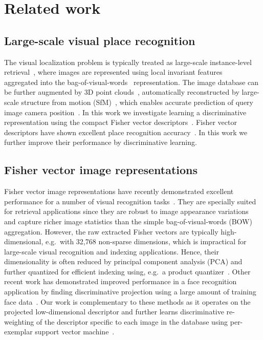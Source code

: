 \documentclass[table]{article} %
\begin{document}
\section{Related work} 
\label{sec:related}

\subsection*{Large-scale visual place recognition} \vspace{-3mm}
    The visual localization problem is typically treated as large-scale instance-level retrieval~\cite{Cummins09,Chen11,Gronat13,Knopp2010,Schindler07,Torii2013,Zamir10}, where images are represented using local invariant
    features~\cite{Lowe04} aggregated into the bag-of-visual-words~\cite{Csurka04,Sivic03} representation. 
    The image database can be further augmented by 3D point clouds~\cite{Klinger13}, automatically
    reconstructed by large-scale structure from motion
    (SfM)~\cite{Agarwal-ICCV-2009,Klinger13}, which enables
    accurate prediction of query image camera
    position~\cite{Li12,Sattler12}.
    In this work we investigate learning a discriminative representation using the compact Fisher vector descriptors~\cite{Jegou12}.
    Fisher vector descriptors have shown excellent place recognition accuracy~\cite{Torii2013}. In this work we further
    improve their performance by discriminative learning.

\vspace{-3mm}
\subsection*{Fisher vector image representations} \vspace{-3mm}
    Fisher vector image representations have recently demonstrated excellent performance for a number of visual recognition tasks~\cite{Chatfield11,Jegou12,Krapac2011,Simonyan2013}.
    They are specially suited for retrieval applications since they are robust to image appearance variations and capture richer image statistics than the simple bag-of-visual-words (BOW) aggregation. However, the raw extracted Fisher vectors are typically high-dimensional, e.g.\ with 32,768 non-sparse dimensions, which is impractical for large-scale visual recognition and indexing applications. Hence, their dimensionality is often reduced by principal component analysis (PCA) and further quantized for efficient indexing using, e.g.\, a product quantizer~\cite{Jegou12}.  Other recent work has demonstrated improved performance in a face recognition application by finding discriminative projection using a large amount of training face data~\cite{Simonyan2013}. Our work is complementary to these methods as it operates on the projected low-dimensional descriptor and further learns discriminative re-weighting of the descriptor specific to each image in the database using per-exemplar support vector machine~\cite{Malisiewicz11}.
\end{document}
